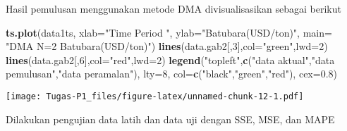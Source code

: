 \documentclass[
]{article}
\newenvironment{Shaded}{\begin{snugshade}}{\end{snugshade}}
\newcommand{\AttributeTok}[1]{\textcolor[rgb]{0.13,0.29,0.53}{#1}}
\newcommand{\DecValTok}[1]{\textcolor[rgb]{0.00,0.00,0.81}{#1}}
\newcommand{\FloatTok}[1]{\textcolor[rgb]{0.00,0.00,0.81}{#1}}
\newcommand{\FunctionTok}[1]{\textcolor[rgb]{0.13,0.29,0.53}{\textbf{#1}}}
\newcommand{\NormalTok}[1]{#1}
\newcommand{\StringTok}[1]{\textcolor[rgb]{0.31,0.60,0.02}{#1}}
\begin{document}
Hasil pemulusan menggunakan metode DMA divisualisasikan sebagai berikut

\begin{Shaded}
\begin{Highlighting}[]
\FunctionTok{ts.plot}\NormalTok{(data1ts, }\AttributeTok{xlab=}\StringTok{"Time Period "}\NormalTok{, }\AttributeTok{ylab=}\StringTok{"Batubara(USD/ton)"}\NormalTok{, }\AttributeTok{main=} \StringTok{"DMA N=2 Batubara(USD/ton)"}\NormalTok{)}
\FunctionTok{lines}\NormalTok{(data.gab2[,}\DecValTok{3}\NormalTok{],}\AttributeTok{col=}\StringTok{"green"}\NormalTok{,}\AttributeTok{lwd=}\DecValTok{2}\NormalTok{)}
\FunctionTok{lines}\NormalTok{(data.gab2[,}\DecValTok{6}\NormalTok{],}\AttributeTok{col=}\StringTok{"red"}\NormalTok{,}\AttributeTok{lwd=}\DecValTok{2}\NormalTok{)}
\FunctionTok{legend}\NormalTok{(}\StringTok{"topleft"}\NormalTok{,}\FunctionTok{c}\NormalTok{(}\StringTok{"data aktual"}\NormalTok{,}\StringTok{"data pemulusan"}\NormalTok{,}\StringTok{"data peramalan"}\NormalTok{), }\AttributeTok{lty=}\DecValTok{8}\NormalTok{, }\AttributeTok{col=}\FunctionTok{c}\NormalTok{(}\StringTok{"black"}\NormalTok{,}\StringTok{"green"}\NormalTok{,}\StringTok{"red"}\NormalTok{), }\AttributeTok{cex=}\FloatTok{0.8}\NormalTok{)}
\end{Highlighting}
\end{Shaded}

\texttt{[image: Tugas-P1\_files/figure-latex/unnamed-chunk-12-1.pdf]}

Dilakukan pengujian data latih dan data uji dengan SSE, MSE, dan MAPE
\end{document}
